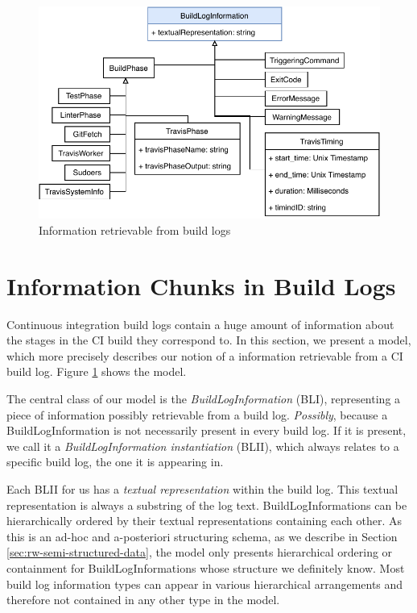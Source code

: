 \documentclass[\myrootdir/main.tex]{subfiles}
\begin{document}
\begin{figure}[htbp]
	\centering
	\includegraphics[width=\textwidth, clip]{img/build-log-information.pdf}
	\caption{Information retrievable from build logs}
	\label{fig:build-log-information}
\end{figure}
\section{Information Chunks in Build Logs}
\label{sec:bli}
Continuous integration build logs contain a huge amount of information about the stages in the CI build they correspond to.
In this section, we present a model, which more precisely describes our notion of a information retrievable from a CI build log.
Figure \ref{fig:build-log-information} shows the model.

The central class of our model is the \emph{BuildLogInformation} (BLI), representing a piece of information possibly retrievable from a build log.
\emph{Possibly}, because a BuildLogInformation is not necessarily present in every build log.
If it is present, we call it a \emph{BuildLogInformation instantiation} (BLII), which always relates to a specific build log, the one it is appearing in.

Each BLII for us has a \emph{textual representation} within the build log.
This textual representation is always a substring of the log text.
BuildLogInformations can be hierarchically ordered by their textual representations containing each other.
As this is an ad-hoc and a-posteriori structuring schema, as we describe in Section \ref{sec:rw-semi-structured-data}, the model only presents hierarchical ordering or containment for BuildLogInformations whose structure we definitely know.
Most build log information types can appear in various hierarchical arrangements and therefore not contained in any other type in the model.
\end{document}
